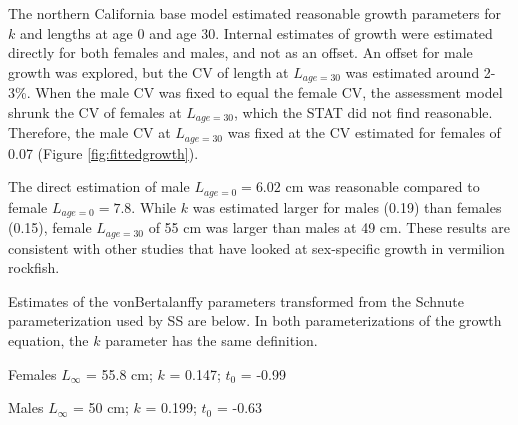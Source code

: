 \documentclass[11pt,
  english,
]{article}
\begin{document}
The northern California base model estimated reasonable growth parameters for {\(k\)\leavevmode\tagmcend\tagstructend} and lengths at age 0 and age 30. Internal estimates of growth were estimated directly for both females and males, and not as an offset. An offset for male growth was explored, but the CV of length at {\(L_{age=30}\)\leavevmode\tagmcend\tagstructend} was estimated around 2-3\%. When the male CV was fixed to equal the female CV, the assessment model shrunk the CV of females at {\(L_{age=30}\)\leavevmode\tagmcend\tagstructend}, which the STAT did not find reasonable. Therefore, the male CV at {\(L_{age=30}\)\leavevmode\tagmcend\tagstructend} was fixed at the CV estimated for females of 0.07 (Figure \ref{fig:fittedgrowth}).

The direct estimation of male {\(L_{age=0}=6.02\)\leavevmode\tagmcend\tagstructend} cm was reasonable compared to female {\(L_{age=0}=7.8\)\leavevmode\tagmcend\tagstructend}. While {\(k\)\leavevmode\tagmcend\tagstructend} was estimated larger for males (0.19) than females (0.15), female {\(L_{age=30}\)\leavevmode\tagmcend\tagstructend} of 55 cm was larger than males at 49 cm. These results are consistent with other studies that have looked at sex-specific growth in vermilion rockfish.

Estimates of the vonBertalanffy parameters transformed from the Schnute parameterization used by SS are below. In both parameterizations of the growth equation, the {\(k\)\leavevmode\tagmcend\tagstructend} parameter has the same definition.

\begin{centering}

Females $L_{\infty}$ = 55.8 cm; $k$ = 0.147; $t_0$ = -0.99

Males $L_{\infty}$ = 50 cm; $k$ = 0.199; $t_0$ = -0.63

\end{centering}

\vspace{0.5cm}

\end{document}
